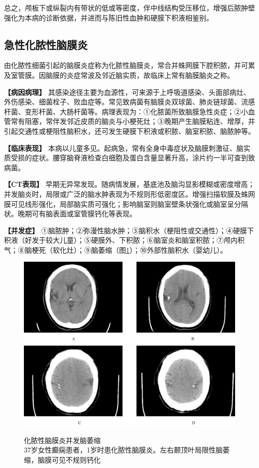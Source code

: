 总之，颅板下或纵裂内有带状的低或等密度，伴中线结构受压移位，增强后脓肿壁强化为本病的诊断依据，并进而与陈旧性血肿和硬膜下积液相鉴别。

\subsection{急性化脓性脑膜炎}

由化脓性细菌引起的脑膜炎症称为化脓性脑膜炎，常合并蛛网膜下腔积脓，并可累及室管膜。因脑膜的炎症常波及邻近脑实质，故临床上常有脑膜脑炎之称。

\textbf{【病因病理】}
其感染途径主要为血源性，可来源于上呼吸道感染、头面部病灶、外伤感染、细菌栓子、败血症等。常见致病菌有脑膜炎双球菌、肺炎链球菌、流感杆菌、变形杆菌、大肠杆菌等。病理表现为：①化脓菌所致脑膜急性炎症；②小血管常有阻塞，常伴发邻近皮质的脑炎与小梗死灶；③晚期产生脑膜粘连、增厚，并引起交通性或梗阻性脑积水，还可发生硬膜下积液或积脓、脑室积脓、脑脓肿等。

\textbf{【临床表现】}
本病以儿童多见。起病急，常有全身中毒症状及脑膜刺激征、脑实质受损的症状。腰穿脑脊液检查白细胞及蛋白含量显著升高，涂片约一半可查到致病菌。

\textbf{【CT表现】}
早期无异常发现。随病情发展，基底池及脑沟显影模糊或密度增高；并发脑炎时，局限或广泛的脑水肿表现为不规则形低密度区。增强扫描软膜及蛛网膜可见线形强化，局部脑实质可强化；影响脑室则脑室壁条状强化或脑室呈分隔状。晚期可有脑表面或室管膜钙化等表现。

\textbf{【并发症】}
①脑脓肿；②弥漫性脑水肿；③脑积水（梗阻性或交通性）；④硬膜下积液（好发于较大儿童）；⑤硬膜外、下积脓；⑥脑室炎和脑室积脓；⑦颅内积气；⑧脑梗死（软化灶）；⑨脑萎缩（图\ref{fig2-54}）；⑩外部性脑积水（婴幼儿）。



\begin{figure}[!htbp]
 \centering
 \includegraphics[width=.7\textwidth,height=\textheight,keepaspectratio]{./images/Image00092.jpg}
 \includegraphics[width=.7\textwidth,height=\textheight,keepaspectratio]{./images/Image00093.jpg}
 \captionsetup{justification=centering}
 \caption{化脓性脑膜炎并发脑萎缩\\{\small 37岁女性癫痫患者，1岁时患化脓性脑膜炎。左右颞顶叶局限性脑萎缩，脑膜可见不规则钙化}}
 \label{fig2-54}
  \end{figure} 


